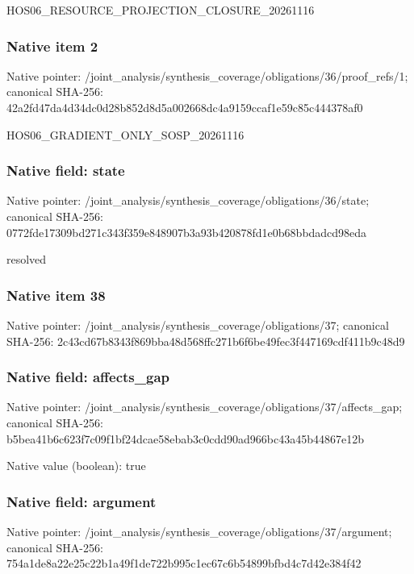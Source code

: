 \documentclass[10pt,a4paper]{article}
\begin{document}
\begingroup\raggedright\sloppy HOS06\_\allowbreak{}RESOURCE\_\allowbreak{}PROJECTION\_\allowbreak{}CLOSURE\_\allowbreak{}20261116\par\endgroup

\subsubsection{Native item 2}
Native pointer: /joint\_\allowbreak{}analysis/synthesis\_\allowbreak{}coverage/obligations/36/proof\_\allowbreak{}refs/1; canonical SHA-256: 42a2fd47da4d34dc0d28b852d8d5a002668dc4a9159ccaf1e59c85c444378af0

\begingroup\raggedright\sloppy HOS06\_\allowbreak{}GRADIENT\_\allowbreak{}ONLY\_\allowbreak{}SOSP\_\allowbreak{}20261116\par\endgroup

\subsubsection{Native field: state}
Native pointer: /joint\_\allowbreak{}analysis/synthesis\_\allowbreak{}coverage/obligations/36/state; canonical SHA-256: 0772fde17309bd271c343f359e848907b3a93b420878fd1e0b68bbdadcd98eda

\begingroup\raggedright\sloppy resolved\par\endgroup

\subsubsection{Native item 38}
Native pointer: /joint\_\allowbreak{}analysis/synthesis\_\allowbreak{}coverage/obligations/37; canonical SHA-256: 2c43cd67b8343f869bba48d568ffc271b6f6be49fec3f447169cdf411b9c48d9

\subsubsection{Native field: affects\_\allowbreak{}gap}
Native pointer: /joint\_\allowbreak{}analysis/synthesis\_\allowbreak{}coverage/obligations/37/affects\_\allowbreak{}gap; canonical SHA-256: b5bea41b6c623f7c09f1bf24dcae58ebab3c0cdd90ad966bc43a45b44867e12b

Native value (boolean): true

\subsubsection{Native field: argument}
Native pointer: /joint\_\allowbreak{}analysis/synthesis\_\allowbreak{}coverage/obligations/37/argument; canonical SHA-256: 754a1de8a22e25c22b1a49f1de722b995c1ec67c6b54899bfbd4c7d42e384f42
\end{document}
